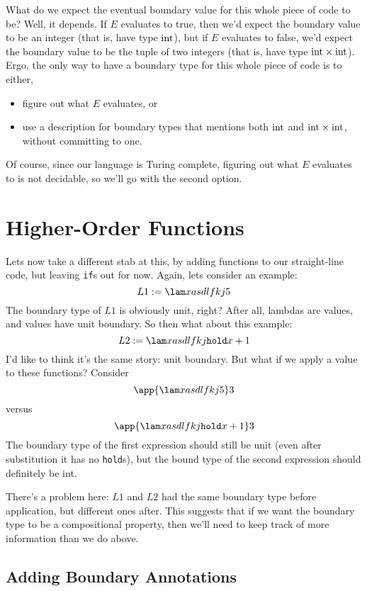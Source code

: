 \documentclass[]{article}
\newcommand {\next}{asdlfkj}
\begin{document}
\begin{abstrsyn}
What do we expect the eventual boundary value for this whole piece of code to be?
Well, it depends. 
If $E$ evaluates to true, then we'd expect the boundary value to be an integer (that is, have type ${\rm int}$),
but if $E$ evaluates to false, we'd expect the boundary value to be the tuple of two integers (that is, have type ${\rm int} \times {\rm int}$).
Ergo, the only way to have a boundary type for this whole piece of code is to either,
\begin{itemize}
\item figure out what $E$ evaluates, or
\item use a description for boundary types that mentions both ${\rm int}$ and ${\rm int} \times {\rm int}$, 
without committing to one.
\end{itemize}

Of course, since our language is Turing complete, figuring out what $E$ evaluates to is not decidable,
so we'll go with the second option.

\section{Higher-Order Functions}
\label{sec:higherorder}

Lets now take a different stab at this, by adding functions to our straight-line code,
but leaving \texttt{if}s out for now.
Again, lets consider an example:
\[
L1 := \lam x {\next{5}}
\]
The boundary type of $L1$ is obviously unit, right?
After all, lambdas are values, and values have unit boundary.
So then what about this example:
\[
L2 := \lam x {\next{\pause{x}+1}}
\]
I'd like to think it's the same story: unit boundary.
But what if we apply a value to these functions?
Consider
\[
\app {\lam x {\next{5}}} 3
\]
versus
\[
\app {\lam x {\next{\pause{x}+1}}} 3
\]
The boundary type of the first expression should still be unit 
(even after substitution it has no {\tt hold}s),
but the bound type of the second expression should definitely be int.

There's a problem here: $L1$ and $L2$ had the same boundary type before application, but different ones after.
This suggests that if we want the boundary type to be a compositional property,
then we'll need to keep track of more information than we do above.

\subsection{Adding Boundary Annotations}


\end{abstrsyn}
\end{document}
